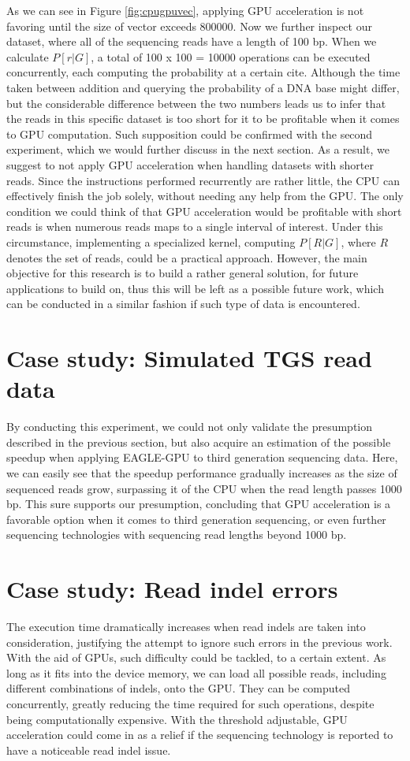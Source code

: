 \documentclass{PHlab-thesis}
\begin{document}
As we can see in Figure \ref{fig:cpugpuvec}, applying GPU acceleration is not favoring until the size of vector exceeds 800000. Now we further inspect our dataset, where all of the sequencing reads have a length of 100 bp. When we calculate $P[r|G]$, a total of 100 x 100 = 10000 operations can be executed concurrently, each computing the probability at a certain cite. Although the time taken between addition and querying the probability of a DNA base might differ, but the considerable difference between the two numbers leads us to infer that the reads in this specific dataset is too short for it to be profitable when it comes to GPU computation. Such supposition could be confirmed with the second experiment, which we would further discuss in the next section. As a result, we suggest to not apply GPU acceleration when handling datasets with shorter reads. Since the instructions performed recurrently are rather little, the CPU can effectively finish the job solely, without needing any help from the GPU. The only condition we could think of that GPU acceleration would be profitable with short reads is when numerous reads maps to a single interval of interest. Under this circumstance, implementing a specialized kernel, computing $P[R|G]$, where $R$ denotes the set of reads, could be a practical approach. However, the main objective for this research is to build a rather general solution, for future applications to build on, thus this will be left as a possible future work, which can be conducted in a similar fashion if such type of data is encountered.

\section{Case study: Simulated TGS read data}
By conducting this experiment, we could not only validate the presumption described in the previous section, but also acquire an estimation of the possible speedup when applying EAGLE-GPU to third generation sequencing data. Here, we can easily see that the speedup performance gradually increases as the size of sequenced reads grow, surpassing it of the CPU when the read length passes 1000 bp. This sure supports our presumption, concluding that GPU acceleration is a favorable option when it comes to third generation sequencing, or even further sequencing technologies with sequencing read lengths beyond 1000 bp.

\section{Case study: Read indel errors}
The execution time dramatically increases when read indels are taken into consideration, justifying the attempt to ignore such errors in the previous work. With the aid of GPUs, such difficulty could be tackled, to a certain extent. As long as it fits into the device memory, we can load all possible reads, including different combinations of indels, onto the GPU. They can be computed concurrently, greatly reducing the time required for such operations, despite being computationally expensive. With the threshold adjustable, GPU acceleration could come in as a relief if the sequencing technology is reported to have a noticeable read indel issue.
\end{document}
